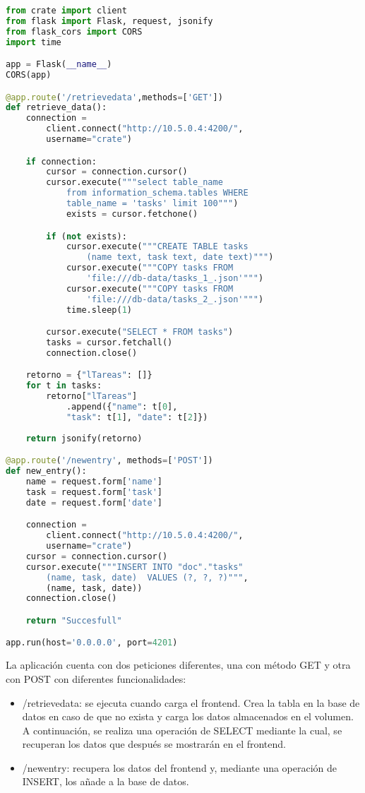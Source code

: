 \documentclass[12pt]{article}
\begin{document}
\begin{lstlisting}[caption={Código de app.py},captionpos=b,language=python]
from crate import client
from flask import Flask, request, jsonify
from flask_cors import CORS
import time

app = Flask(__name__)
CORS(app)

@app.route('/retrievedata',methods=['GET'])
def retrieve_data():
    connection = 
        client.connect("http://10.5.0.4:4200/", 
        username="crate")

    if connection:
        cursor = connection.cursor()
        cursor.execute("""select table_name 
            from information_schema.tables WHERE 
            table_name = 'tasks' limit 100""")
            exists = cursor.fetchone()

        if (not exists):
            cursor.execute("""CREATE TABLE tasks 
                (name text, task text, date text)""")
            cursor.execute("""COPY tasks FROM 
                'file:///db-data/tasks_1_.json'""")
            cursor.execute("""COPY tasks FROM 
                'file:///db-data/tasks_2_.json'""")
            time.sleep(1)

        cursor.execute("SELECT * FROM tasks")
        tasks = cursor.fetchall()
        connection.close()

    retorno = {"lTareas": []}
    for t in tasks:
        retorno["lTareas"]
            .append({"name": t[0], 
            "task": t[1], "date": t[2]})
    
    return jsonify(retorno)

@app.route('/newentry', methods=['POST'])
def new_entry():
    name = request.form['name']
    task = request.form['task']
    date = request.form['date']

    connection = 
        client.connect("http://10.5.0.4:4200/",
        username="crate")
    cursor = connection.cursor()
    cursor.execute("""INSERT INTO "doc"."tasks" 
        (name, task, date)  VALUES (?, ?, ?)""",
        (name, task, date))
    connection.close()

    return "Succesfull"

app.run(host='0.0.0.0', port=4201)

\end{lstlisting}

La aplicación cuenta con dos peticiones diferentes, una con método GET y otra con POST con
diferentes funcionalidades:
\begin{itemize}
    \item /retrievedata: se ejecuta cuando carga el frontend. Crea la tabla en la base de datos
    en caso de que no exista y carga los datos almacenados en el volumen. A continuación, se realiza
    una operación de SELECT mediante la cual, se recuperan los datos que después se mostrarán en el frontend.
    \item /newentry: recupera los datos del frontend y, mediante una operación de INSERT, los añade a la
    base de datos.
\end{itemize}
\end{document}
